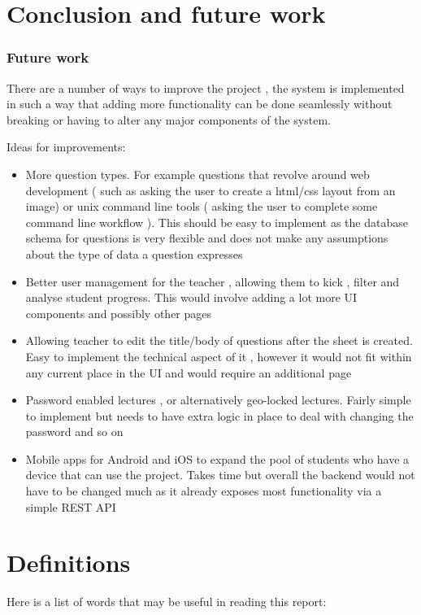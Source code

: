 \documentclass[12pt]{article}
\begin{document}
\section{Conclusion and future work}

\subsubsection{Future work}
There are a number of ways to improve the project , the system is implemented in such a way that adding more functionality can be done seamlessly without breaking or having to alter any major components of the system.

Ideas for improvements:
\begin{itemize}
	\item More question types. For example questions that revolve around web development ( such as asking the user to create a html/css layout from an image) or unix command line tools ( asking the user to complete some command line workflow ). This should be easy to implement as the database schema for questions is very flexible and does not make any assumptions about the type of data a question expresses
	\item Better user management for the teacher , allowing them to kick , filter and analyse student progress. This would involve adding a lot more UI components and possibly other pages
	\item Allowing teacher to edit the title/body of questions after the sheet is created. Easy to implement the technical aspect of it , however it would not fit within any current place in the UI and would require an additional page
	\item Password enabled lectures , or alternatively geo-locked lectures. Fairly simple to implement but needs to have extra logic in place to deal with changing the password and so on
	\item Mobile apps for Android and iOS to expand the pool of students who have a device that can use the project. Takes time but overall the backend would not have to be changed much as it already exposes most functionality via a simple REST API
\end{itemize}


\section{Definitions}
Here is a list of words that may be useful in reading this report:
\end{document}
